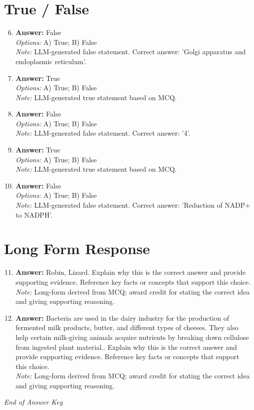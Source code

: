\documentclass[12pt]{article}
\begin{document}
\section*{True / False}
\begin{enumerate}[label=\arabic*.]
\setcounter{enumi}{5}
\item \textbf{Answer:} False
\\ \textit{Options:} A) True; B) False
\\ \textit{Note:} LLM-generated false statement. Correct answer: 'Golgi apparatus and endoplasmic reticulum'.
\item \textbf{Answer:} True
\\ \textit{Options:} A) True; B) False
\\ \textit{Note:} LLM-generated true statement based on MCQ.
\item \textbf{Answer:} False
\\ \textit{Options:} A) True; B) False
\\ \textit{Note:} LLM-generated false statement. Correct answer: '4'.
\item \textbf{Answer:} True
\\ \textit{Options:} A) True; B) False
\\ \textit{Note:} LLM-generated true statement based on MCQ.
\item \textbf{Answer:} False
\\ \textit{Options:} A) True; B) False
\\ \textit{Note:} LLM-generated false statement. Correct answer: 'Reduction of NADP+ to NADPH'.
\end{enumerate}

\section*{Long Form Response}
\begin{enumerate}[label=\arabic*.]
\setcounter{enumi}{10}
\item \textbf{Answer:} Robin, Lizard. Explain why this is the correct answer and provide supporting evidence. Reference key facts or concepts that support this choice.
\\ \textit{Note:} Long-form derived from MCQ; award credit for stating the correct idea and giving supporting reasoning.
\item \textbf{Answer:} Bacteria are used in the dairy industry for the production of fermented milk products, butter, and different types of cheeses. They also help certain milk-giving animals acquire nutrients by breaking down cellulose from ingested plant material.. Explain why this is the correct answer and provide supporting evidence. Reference key facts or concepts that support this choice.
\\ \textit{Note:} Long-form derived from MCQ; award credit for stating the correct idea and giving supporting reasoning.
\end{enumerate}

\vfill
\noindent\textit{End of Answer Key}
\end{document}
